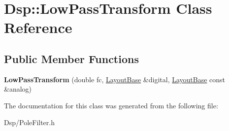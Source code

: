 \hypertarget{classDsp_1_1LowPassTransform}{\section{Dsp\-:\-:Low\-Pass\-Transform Class Reference}
\label{classDsp_1_1LowPassTransform}
}
\subsection*{Public Member Functions}
\begin{DoxyCompactItemize}
\item 
\hypertarget{classDsp_1_1LowPassTransform_a4489813a22030789d60efeb651503422}{{\bfseries Low\-Pass\-Transform} (double fc, \hyperlink{classDsp_1_1LayoutBase}{Layout\-Base} \&digital, \hyperlink{classDsp_1_1LayoutBase}{Layout\-Base} const \&analog)}\label{classDsp_1_1LowPassTransform_a4489813a22030789d60efeb651503422}

\end{DoxyCompactItemize}


The documentation for this class was generated from the following file\-:\begin{DoxyCompactItemize}
\item 
Dsp/Pole\-Filter.\-h\end{DoxyCompactItemize}
